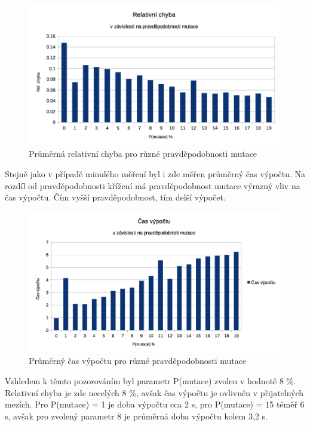 \documentclass[a4paper]{article}
\begin{document}
	\begin{figure}[h]\centering
		\includegraphics[width=0.99\textwidth]{chyba-mutace.png} 
		\caption{Průměrná relativní chyba pro různé pravděpodobnosti mutace}
		\label{err-mutace}
	\end{figure}
	
	Stejně jako v případě minulého měření byl i zde měřen průměrný čas výpočtu. Na rozdíl od pravděpodobnosti křížení má pravděpodobnost mutace výrazný vliv na čas výpočtu. Čím vyšší pravděpodobnost, tím delší výpočet.
	
	\begin{figure}[h]\centering
		\includegraphics[width=0.99\textwidth]{cas-mutace.png} 
		\caption{Průměrný čas výpočtu pro různé pravděpodobnosti mutace}
		\label{time-mutace}
	\end{figure}
	
	Vzhledem k těmto pozorováním byl parametr P(mutace) zvolen v hodnotě 8 \%. Relativní chyba je zde necelých 8 \%, avšak čas výpočtu je ovlivněn v přijatelných mezích. Pro P(mutace) = 1 je doba výpočtu cca 2 s, pro P(mutace) = 15 téměř 6 s, avšak pro zvolený parametr 8 je průměrná doba výpočtu kolem 3,2 s.
	
\end{document}
